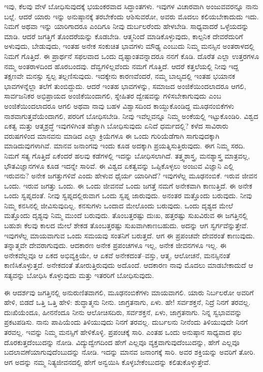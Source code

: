 ಇವು, ಕೆಲವು ವೇಳೆ ಬೋಧಿಸುವುದಕ್ಕೆ ಭಯಂಕರವಾದ ಸಿದ್ಧಾಂತಗಳು. ಇವುಗಳ ವಿಚಾರವಾಗಿ ಅಂಜುವವರನ್ನೂ ನಾನು ಬಲ್ಲೆ. ಆದರೆ ಯಾರು ಇನ್ನು ಅನುಷ್ಠಾನಕ್ಕೆ ತರಬೇಕೆಂದು ಆಶಿಸುವರೋ, ಅವರು ಮೊದಲು ಕಲಿಯಬೇಕಾದುದು ಇದು. ನಿಮಗೆ ಅಥವಾ ಇನ್ನು ಯಾರಿಗಾದರೂ ಎಂದಿಗೂ ನೀವು ದುರ್ಬಲರೆಂದು ಹೇಳಬೇಡಿ. ಸಾಧ್ಯವಾದರೆ ಒಳ್ಳೆಯದನ್ನು ಮಾಡಿ. ಆದರೆ ಜಗತ್ತಿಗೆ ತೊಂದರೆಯನ್ನು ಕೊಡಬೇಡಿ. ಆತ್ಮನಿಂದೆ ಮಾಡಿಕೊಳ್ಳುವುದು, ಕಾಲ್ಪನಿಕ ದೇವರೆದುರಿಗೆ ಅಳುವುದು, ಬೇಡುವುದು, ಇಂತಹ ಅನೇಕ ಸಂಕುಚಿತ ಭಾವಗಳು ಮೌಢ್ಯ ಎಂಬುದು ನಿಮ್ಮ ಮನಸ್ಸಿನ ಅಂತರಾಳದಲ್ಲಿ ನಿಮಗೆ ಗೊತ್ತಿದೆ. ಈ ಪ್ರಾರ್ಥನೆ ಸಫಲವಾದ ಒಂದು ದೃಷ್ಟಾಂತವನ್ನಾದರೂ ನನಗೆ ಕೊಡಿ. ದೊರೆತ ಎಲ್ಲಾ ಉತ್ತರಗಳೂ ನಮ್ಮ ಅಂತರಾಳದಿಂದ ಹೊರಬಂದವು. ದೆವ್ವಗಳಿಲ್ಲವೆಂದು ನಮಗೆ ಗೊತ್ತಿದೆ. ಆದರೆ ಕತ್ತಲೆಯಲ್ಲಿ ನೀವು ಇದ್ದ ತಕ್ಷಣವೇ ಮನಸ್ಸು ಸ್ವಲ್ಪ ತಲ್ಲಣಿಸುವುದು. ಇದಕ್ಕೇನು ಕಾರಣವೆಂದರೆ, ನಮ್ಮ ಬಾಲ್ಯದಲ್ಲಿ ಇಂತಹ ಭಯಾನಕ ಭಾವಗಳನ್ನೆಲ್ಲಾ ತಲೆಗೆ ತುಂಬಿದ್ದುದು. ಆದರೆ ಇಂತಹ ಭಾವಗಳನ್ನು, ಸಮಾಜದ ಅಂಜಿಕೆಯಿಂದಲಾದರೂ ಆಗಲಿ, ಸಾರ್ವಜನಿಕರ ಅಭಿಪ್ರಾಯದ ಅಂಜಿಕೆಯಿಂದಾಗಲಿ, ಸ್ನೇಹಿತರ ದ್ವೇಷವನ್ನು ಗಳಿಸಬೇಕಾಗುವುದು ಎಂಬ ಅಂಜಿಕೆಯಿಂದಲಾದರೂ ಆಗಲಿ ಅಥವಾ ನಾವು ಬಹಳ ವಿಶ್ವಾಸದಿಂದ ಕಾಯ್ದುಕೊಂಡಿದ್ದ ಮೂಢನಂಬಿಕೆಗಳು ನಾಶವಾಗುತ್ತವೆಯೆಂದಾಗಲಿ, ಪರರಿಗೆ ಬೋಧಿಸಬೇಡಿ. ನೀವು ಇವೆಲ್ಲವನ್ನೂ ನಿಮ್ಮ ಅಂಕೆಯಲ್ಲಿ ಇಟ್ಟುಕೊಂಡಿರಿ. ವಿಶ್ವದ ಏಕತ್ವ ಮತ್ತು ಆತ್ಮಶ್ರದ್ಧೆ ಇವುಗಳಿಗಿಂತ ಹೆಚ್ಚಾಗಿ ಬೋಧಿಸುವುದು ಏನಿದೆ ಧರ್ಮದಲ್ಲಿ? ಕಳೆದ ಸಾವಿರಾರು ವರುಷಗಳಿಂದ ಮಾನವನು ಮಾಡಿದ ಎಲ್ಲಾ ಕ್ರಿಯೆಗಳೂ ಈ ಒಂದು ಗುರಿಯೆಡೆಗಾಗಿ ಸಾಗುವುದಕ್ಕಾಗಿ ಮಾಡಿದುವುಗಳಾಗಿವೆ. ಮಾನವ ಜನಾಂಗವು ಇಂದು ಕೂಡ ಅದಕ್ಕಾಗಿ ಪ್ರಯತ್ನಿಸುತ್ತಿರುವುದು. ಈಗ ನಿಮ್ಮ ಸರದಿ. ನಿಮಗೆ ಸತ್ಯ ಗೊತ್ತಿದೆ ಏಕೆಂದರೆ ಹಲವು ಕಡೆಗಳಲ್ಲಿ ಇದನ್ನು ಬೋಧಿಸಲಾಗಿದೆ. ತತ್ತ್ವಶಾಸ್ತ್ರ, ಮನಶ್ಯಾಸ್ತ್ರ ಮಾತ್ರವಲ್ಲ, ಭೌತವಿಜ್ಞಾನಗಳೂ ಕೂಡ ಇದನ್ನೇ ಸಾರಿವೆ. ಈ ವಿಶ್ವದ ಏಕತ್ವವನ್ನು ಒಪ್ಪಿಕೊಳ್ಳಲು ಅಂಜುವ ವಿಜ್ಞಾನಿ ಎಲ್ಲಿ ಇರುವನು? ಅನೇಕ ಜಗತ್ತುಗಳಿವೆ ಎಂದು ಹೇಳುವ ಧೈರ್ಯ ಯಾರಿಗಿದೆ? ಇವುಗಳೆಲ್ಲ ಮೂಢನಂಬಿಕೆ. ಇರುವ ಜೀವನ ಒಂದು. ಇರುವ ಜಗತ್ತು ಒಂದು. ಈ ಒಂದು ಜೀವನವೆ ಒಂದು ಜಗತ್ತೆ ನಮಗೆ ಅನೇಕವಾಗಿ ಕಾಣುತ್ತಿದೆ. ಈ ಅನೇಕ ಒಂದು ಸ್ವಪ್ನದಂತೆ. ನೀವು ಸ್ವಪ್ನದಲ್ಲಿರುವಾಗ ಒಂದು ಸ್ವಪ್ನ ಜಾರುವುದು. ಅನಂತರ ಮತ್ತೊಂದು ಬರುವುದು. ನೀವು ನಿಮ್ಮ ಕನಸಿನಲ್ಲಿ ಜೀವಿಸುವುದಿಲ್ಲ. ಕನಸುಗಳು ಒಂದಾದ ಮೇಲೊಂದು ಬರುವುದು. ಒಂದು ದೃಶ್ಯದ ಮೇಲೆ ಮತ್ತೊಂದು ದೃಶ್ಯವು ನಿಮ್ಮ ಮುಂದೆ ಬರುವುದು. ತೊಂಬತ್ತರಷ್ಟು ದುಃಖ, ಹತ್ತರಷ್ಟು ಸುಖವಿರುವ ಈ ಜಗತ್ತಿನಲ್ಲಿ ಬಹುಶಃ ಕೆಲವು ಕಾಲದ ಮೇಲೆ ಶೇಕಡ ತೊಂಬತ್ತರಷ್ಟು ಸುಖವಾಗಿ\break ಕಾಣಬಹುದು. ಅದನ್ನು ಆಗ ಸ್ವರ್ಗವೆನ್ನುತ್ತೇವೆ. ಇವುಗಳೆಲ್ಲ ಮಾಯವಾಗುವ ಒಂದು ಸಮಯವು ಸಂತನಿಗೆ ಬರುತ್ತದೆ. ಆಗ ಈ ಪ್ರಪಂಚವೇ ದೇವರಂತೆ ಕಾಣುವುದು. ತನ್ನಾತ್ಮವೇ ದೇವರಾಗುವುದು. ಆದಕಾರಣ ಅನೇಕ ಪ್ರಪಂಚಗಳೂ ಇಲ್ಲ, ಅನೇಕ ಜೀವನಗಳೂ ಇಲ್ಲ. ಈ ಅನೇಕವೆಲ್ಲವೂ ಆ ಏಕದ ಅಭಿವ್ಯಕ್ತಿಯೇ, ಆ ಏಕವೆ ಅನೇಕದಂತೆ–ವಸ್ತು, ಆತ್ಮ, ಆಲೋಚನೆ, ಮನಸ್ಸಿನಂತೆ ಕಾಣಿಸಿಕೊಳ್ಳುತ್ತದೆ. ಅನೇಕದಂತೆ ತೋರುತ್ತಿರುವುದು ಅದೊಂದೆ. ಆದಕಾರಣ ನಾವು ಮೊದಲು ಮಾಡಬೇಕಾದುದೆ ಆ ಸತ್ಯವನ್ನು ಬೋಧಿಸಿ ಕೊಳ್ಳುವುದು ಮತ್ತು ಇತರರಿಗೆ ಬೋಧಿಸುವುದು. 

\vskip 8pt

ಈ ಆದರ್ಶವು ಜಗತ್ತಿನಲ್ಲಿ ಅನುರುಣಿತವಾಗಲಿ, ಮೂಢನಂಬಿಕೆಗಳು ಮಾಯವಾಗಲಿ. ಯಾರು ನಿರ್ಬಲರೋ ಅವರಿಗೆ ಹೇಳಿ, ಬಿಡದೆ ಒತ್ತಿ ಒತ್ತಿ ಹೇಳಿ: ಶುದ್ಧಾತ್ಮನು ನೀನು. ಜಾಗ್ರತನಾಗು, ಏಳು. ಹೇ! ಸರ್ವಶಕ್ತನೆ, ನಿದ್ರೆ ನಿನಗೆ ತರವಲ್ಲ. ದುಃಖಿಯೆಂದೂ, ಹೀನನೆಂದೂ ನೀನು ಆಲೋಚಿಸದಿರು, ಸರ್ವಶಕ್ತನೆ, ಏಳು, ಜಾಗ್ರತನಾಗು. ನಿನ್ನ ಸ್ವಭಾವವನ್ನು ಪ್ರಕಟಪಡಿಸು. ನಾನು ಪಾಪಿಯೆಂದು ತಿಳಿಯುವುದು ನಿನಗೆ ತರವಲ್ಲ. ದುರ್ಬಲನು ನೀನೆಂದು ತಿಳಿಯುವುದೇ ನಿನಗೆ ತರವಲ್ಲ. ಇವನ್ನು ನಿಮ್ಮ ಮನಸ್ಸಿಗೆ ಹೇಳಿಕೊಳ್ಳಿ. ಪ್ರಪಂಚಕ್ಕೆ ಸಾರಿ. ಎಂತಹ ಒಂದು ಅನುಷ್ಠಾನ ಸಾಧ್ಯವಾದ ಫಲ ದೊರಕುತ್ತದೆಂಬುದನ್ನು ನೋಡಿ. ವಿದ್ಯುದ್ವೇಗದಿಂದ ಹೇಗೆ ಎಲ್ಲವೂ ವ್ಯಕ್ತವಾಗುವುದೆಂಬುದನ್ನು, ಹೇಗೆ ಎಲ್ಲವೂ ಬದಲಾವಣೆಯಾಗುವುದೆಂಬುದನ್ನು ನೋಡಿ. ಇದನ್ನು ಮಾನವ ಜನಾಂಗಕ್ಕೆ ಸಾರಿ. ಅವರ ಶಕ್ತಿಯನ್ನು ಅವರಿಗೆ ತೋರಿ. ಆಗ ಅದನ್ನು ನಮ್ಮ ನಿತ್ಯಜೀವನದಲ್ಲಿ ಹೇಗೆ ಅನ್ವಯಿಸಿ ಕೊಳ್ಳಬೇಕೆಂಬುದನ್ನು ಕಲಿತುಕೊಳ್ಳುತ್ತೇವೆ. 

